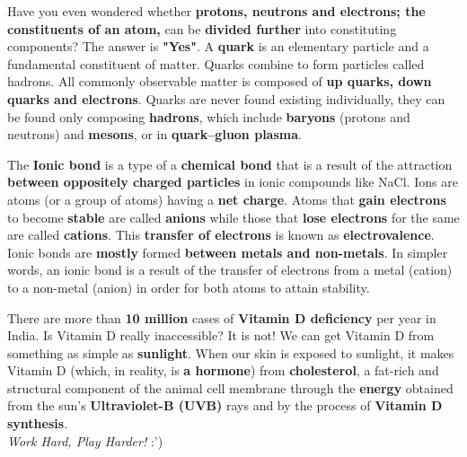 \documentclass{article}
\begin{document}
\begin{phybox}
Have you even wondered whether \textbf{protons, neutrons and electrons; the constituents of an atom,} can be \textbf{divided further} into constituting components? The answer is \textbf{"Yes"}. A \textbf{quark} is an elementary particle and a fundamental constituent of matter. Quarks combine to form particles called hadrons. All commonly observable matter is composed of \textbf{up quarks, down quarks and electrons}. Quarks are never found existing individually, they can be found only composing \textbf{hadrons}, which include \textbf{baryons} (protons and neutrons) and \textbf{mesons}, or in \textbf{quark–gluon plasma}.
\end{phybox}
\begin{chembox}
The \textbf{Ionic bond} is a type of a \textbf{chemical bond} that is a result of the attraction \textbf{between oppositely charged particles} in ionic compounds like NaCl. Ions are atoms (or a group of atoms) having a \textbf{net charge}. Atoms that \textbf{gain electrons} to become \textbf{stable} are called \textbf{anions} while those that \textbf{lose electrons} for the same are called \textbf{cations}. This \textbf{transfer of electrons} is known as \textbf{electrovalence}. Ionic bonds are \textbf{mostly} formed \textbf{between metals and non-metals}. In simpler words, an ionic bond is a result of the transfer of electrons from a metal (cation) to a non-metal (anion) in order for both atoms to attain stability.
\end{chembox}
\begin{biobox}
There are more than \textbf{10 million} cases of \textbf{Vitamin D deficiency} per year in India. Is Vitamin D really inaccessible? It is not! We can get Vitamin D from something as simple as \textbf{sunlight}. When our skin is exposed to sunlight, it makes Vitamin D (which, in reality, is \textbf{a hormone}) from \textbf{cholesterol}, a fat-rich and structural component of the animal cell membrane through the \textbf{energy} obtained from the sun’s \textbf{Ultraviolet-B (UVB)} rays and by the process of \textbf{Vitamin D synthesis}.\\
\textit{Work Hard, Play Harder!} :')
\end{biobox} 
\end{document}
